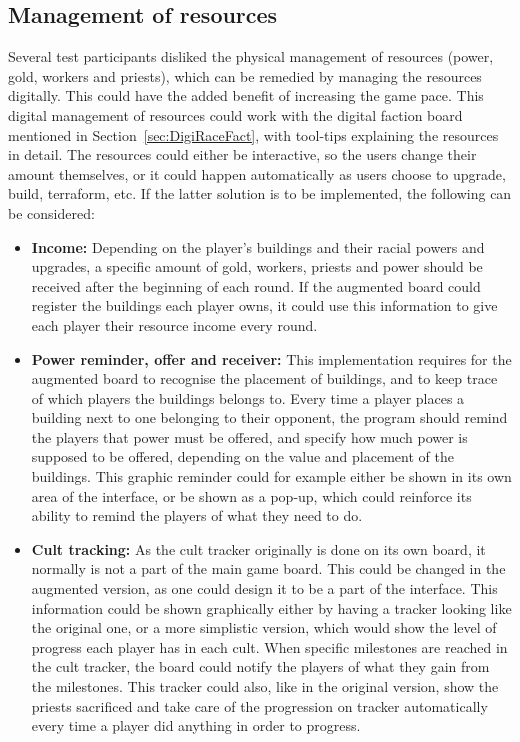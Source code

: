 \subsection{Management of resources}
Several test participants disliked the physical management of resources (power, gold, workers and priests), which can be remedied by managing the resources digitally. This could have the added benefit of increasing the game pace. This digital management of resources could work with the digital faction board mentioned in Section~\ref{sec:DigiRaceFact}, with tool-tips explaining the resources in detail. The resources could either be interactive, so the users change their amount themselves, or it could happen automatically as users choose to upgrade, build, terraform, etc. If the latter solution is to be implemented, the following can be considered:
\begin{itemize}
\item \textbf{Income:} Depending on the player's buildings and their racial powers and upgrades, a specific amount of gold, workers, priests and power should be received after the beginning of each round. If the augmented board could register the buildings each player owns, it could use this information to give each player their resource income every round. 
\item \textbf{Power reminder, offer and receiver:} This implementation requires for the augmented board to recognise the placement of buildings, and to keep trace of which players the buildings belongs to. Every time a player places a building next to one belonging to their opponent, the program should remind the players that power must be offered, and specify how much power is supposed to be offered, depending on the value and placement of the buildings. This graphic reminder could for example either be shown in its own area of the interface, or be shown as a pop-up, which could reinforce its ability to remind the players of what they need to do.
\item \textbf{Cult tracking:} As the cult tracker originally is done on its own board, it normally is not a part of the main game board. This could be changed in the augmented version, as one could design it to be a part of the interface. This information could be shown graphically either by having a tracker looking like the original one, or a more simplistic version, which would show the level of progress each player has in each cult. When specific milestones are reached in the cult tracker, the board could notify the players of what they gain from the milestones. This tracker could also, like in the original version, show the priests sacrificed and take care of the progression on tracker automatically every time a player did anything in order to progress.
\end{itemize}